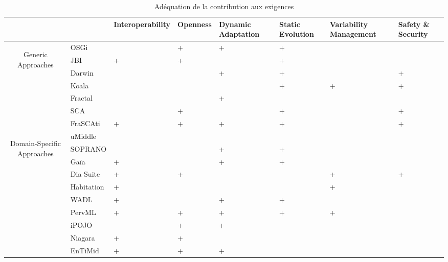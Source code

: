 
\begin{table}[h!]
\begin{tabular}{cm{}|| >{\centering\arraybackslash}m{}| >{\centering\arraybackslash}m{}| >{\centering\arraybackslash}m{}| >{\centering\arraybackslash}m{}| >{\centering}m{}| >{\centering\arraybackslash}m{}|}
 & & {\tiny Interoperability} & {\tiny Openness} & {\tiny Dynamic Adaptation} & {\tiny Static Evolution} & {\tiny Variability Management} & {\tiny Safety \& Security}\\
 \hline\hline
 \multirow{7}{8mm}{\begin{sideways}\parbox{25mm}{\centering Generic Approaches}\end{sideways}}
 &{\small OSGi} 		&  & + & + & + &  &  \\ 
 &{\small JBI} 			& + & + &  & + &  &  \\
 \cline{2-8}%
 &{\small Darwin} 		&  &  & + & + &   & + \\ 
 &{\small Koala} 		&  &  &   & + & + & + \\
 &{\small Fractal} 		&  &  & + &   &   &  \\
 \cline{2-8}%
 &{\small SCA} 			&   & + &  & + &  & +\\
 &{\small FraSCAti}     & + & + & + & + &  & + \\
 \hline\hline
 \multirow{9}{8mm}{\begin{sideways}\parbox{30mm}{\centering  Domain-Specific Approaches}\end{sideways}} 
 &{\small uMiddle} 		&  &  &  &  &  &  \\
 &{\small SOPRANO} 		&  &  & + & + &  &  \\
 &{\small Ga\"ia} 		& + &  & + & + &  &  \\
 &{\small Dia Suite} 	& + & + &  &  & + & + \\
 &{\small Habitation} 	& + &  &  &  & + &  \\
 &{\small WADL} 		& + &  & + & + &  &  \\
 &{\small PervML} 		& + & + & + & + & + &  \\
 &{\small iPOJO} 		&  & + & + &  &  &  \\
 &{\small Niagara} 		& + & + &  &  &  &  \\
 \cline{2-8}
 &{\small EnTiMid} 		& + & + & + &  &  &  \\
 \hline
\end{tabular}
\caption{Adéquation de la contribution aux exigences}
\label{tab:adequatnessFr}
\end{table}

